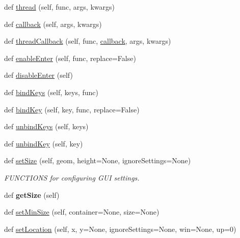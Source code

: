 \begin{DoxyCompactItemize}
def \hyperlink{class_python_01_g_u_i_1_1appjar_1_1gui_a841944979bdfe335c983c40b29c903ac}{thread} (self, func, args, kwargs)
\item 
def \hyperlink{class_python_01_g_u_i_1_1appjar_1_1gui_aa23620962e130effb8dc9dd15198cd50}{callback} (self, args, kwargs)
\item 
def \hyperlink{class_python_01_g_u_i_1_1appjar_1_1gui_acac6edaf6ce89f73ee80aca5542901d1}{thread\+Callback} (self, func, \hyperlink{class_python_01_g_u_i_1_1appjar_1_1gui_aa23620962e130effb8dc9dd15198cd50}{callback}, args, kwargs)
\item 
def \hyperlink{class_python_01_g_u_i_1_1appjar_1_1gui_af2baccf9eff76e5af107a13e3f6720c2}{enable\+Enter} (self, func, replace=False)
\item 
def \hyperlink{class_python_01_g_u_i_1_1appjar_1_1gui_a8c2ce3f29a430cd8ef1e1000491f5ac7}{disable\+Enter} (self)
\item 
def \hyperlink{class_python_01_g_u_i_1_1appjar_1_1gui_a571b02f7cf42cd691f09377be5148f89}{bind\+Keys} (self, keys, func)
\item 
def \hyperlink{class_python_01_g_u_i_1_1appjar_1_1gui_a68a4e36d40eefea11a8c049462ea0873}{bind\+Key} (self, key, func, replace=False)
\item 
def \hyperlink{class_python_01_g_u_i_1_1appjar_1_1gui_a7f94d2239400dadb0d8933064f78dbdd}{unbind\+Keys} (self, keys)
\item 
def \hyperlink{class_python_01_g_u_i_1_1appjar_1_1gui_a273f8c50017293348c2a46d997adbccc}{unbind\+Key} (self, key)
\item 
def \hyperlink{class_python_01_g_u_i_1_1appjar_1_1gui_afa752d5dda3f11949d4728c734e578ad}{set\+Size} (self, geom, height=None, ignore\+Settings=None)
\begin{DoxyCompactList}\small\item\em F\+U\+N\+C\+T\+I\+O\+NS for configuring G\+UI settings. \end{DoxyCompactList}\item 
\mbox{\label{class_python_01_g_u_i_1_1appjar_1_1gui_aca9b433d1825a755de312a9b341291da}} 
def {\bfseries get\+Size} (self)
\item 
def \hyperlink{class_python_01_g_u_i_1_1appjar_1_1gui_ae14addd3d536efda511bd8a7be7be2cd}{set\+Min\+Size} (self, container=None, size=None)
\item 
def \hyperlink{class_python_01_g_u_i_1_1appjar_1_1gui_a4fe68815735538ab1c8a9842660bf0a4}{set\+Location} (self, x, y=None, ignore\+Settings=None, win=None, up=0)

\end{DoxyCompactItemize}
